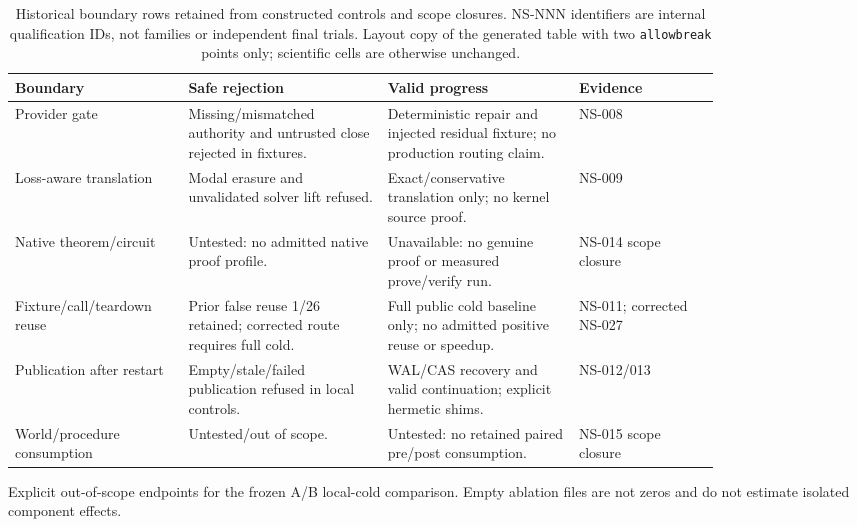 \documentclass{article}
\begin{document}
\begin{table}[t]
  \caption{Historical boundary rows retained from constructed controls and
    scope closures. NS-NNN identifiers are internal qualification IDs, not
    families or independent final trials. Layout copy of the generated table
    with two \texttt{allowbreak} points only; scientific cells are otherwise
    unchanged.}
  \label{tab:boundary}
  \centering
\begin{tabular}{p{0.18\linewidth}p{0.24\linewidth}p{0.23\linewidth}p{0.17\linewidth}}
\hline
Boundary & Safe rejection & Valid progress & Evidence \\
\hline
Provider gate & Missing/mismatched authority and untrusted close rejected in fixtures. & Deterministic repair and injected residual\allowbreak{} fixture; no production routing claim. & NS-008 \\
Loss-aware translation & Modal erasure and unvalidated solver lift refused. & Exact/conservative translation only; no kernel source proof. & NS-009 \\
Native theorem/circuit & Untested: no admitted native proof profile. & Unavailable: no genuine proof or measured prove/verify run. & NS-014 scope closure \\
Fixture/call/\allowbreak teardown reuse & Prior false reuse 1/26 retained; corrected route requires full cold. & Full public cold baseline only; no admitted positive reuse or speedup. & NS-011; corrected NS-027 \\
Publication after restart & Empty/stale/failed publication refused in local controls. & WAL/CAS recovery and valid continuation; explicit hermetic shims. & NS-012/013 \\
World/procedure consumption & Untested/out of scope. & Untested: no retained paired pre/post consumption. & NS-015 scope closure \\
\hline
\end{tabular}
\end{table}

\begin{table}[t]
  \caption{Explicit out-of-scope endpoints for the frozen A/B local-cold
    comparison. Empty ablation files are not zeros and do not estimate
    isolated component effects.}
  \label{tab:ablations}
  \centering
  
\end{table}
\end{document}
